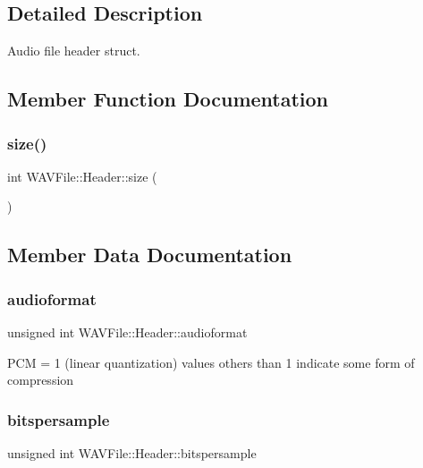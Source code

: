 \subsection{Detailed Description}
Audio file header struct. 

\subsection{Member Function Documentation}
\mbox{\label{struct_w_a_v_file_1_1_header_aa725ada977810d575cad1a55b0030514}} 
\subsubsection{size()}
{\footnotesize\ttfamily int W\+A\+V\+File\+::\+Header\+::size (\begin{DoxyParamCaption}{ }\end{DoxyParamCaption})\hspace{0.3cm}{\ttfamily [inline]}}



\subsection{Member Data Documentation}
\mbox{\label{struct_w_a_v_file_1_1_header_a6d16652e388f953230b0275301c87d2f}} 
\subsubsection{audioformat}
{\footnotesize\ttfamily unsigned int W\+A\+V\+File\+::\+Header\+::audioformat}

P\+CM = 1 (linear quantization) values others than 1 indicate some form of compression \mbox{\label{struct_w_a_v_file_1_1_header_ad731c9ced0b22903be0b24f6528ec061}} 
\subsubsection{bitspersample}
{\footnotesize\ttfamily unsigned int W\+A\+V\+File\+::\+Header\+::bitspersample}

